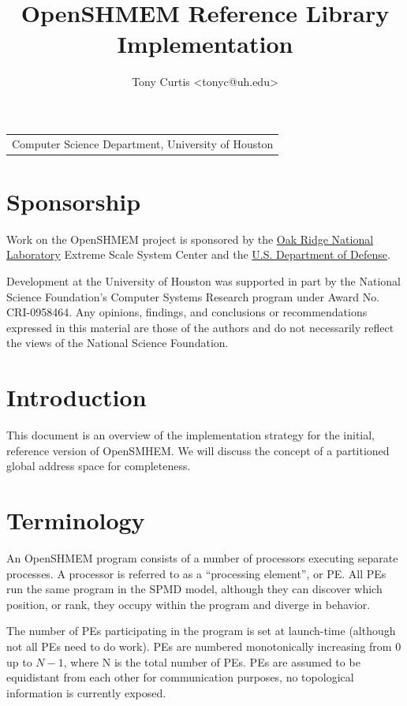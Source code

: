 \documentclass[english]{article}
\newcommand{\lyxrightaddress}[1]{
\par {\raggedleft \begin{tabular}{l}\ignorespaces
#1
\end{tabular}
\vspace{1.4em}
\par}
}
\begin{document}
\title{OpenSHMEM Reference Library Implementation}
\author{Tony Curtis <tonyc@uh.edu>}
\maketitle
\lyxrightaddress{Computer Science Department, University of Houston}

\pagebreak{}
\tableofcontents{}
\pagebreak{}

\section{Sponsorship}

Work on the OpenSHMEM project is sponsored by the
\href{http://www.ornl.gov/}{Oak Ridge National Laboratory} Extreme
Scale System Center and the \href{http://www.defense.gov/}{U.S. Department
of Defense}.

Development at the University of Houston was supported in part by the
National Science Foundation's Computer Systems Research program under
Award No. CRI-0958464.  Any opinions, findings, and conclusions or
recommendations expressed in this material are those of the authors
and do not necessarily reflect the views of the National Science
Foundation.

\section{Introduction}

This document is an overview of the implementation strategy for the
initial, reference version of OpenSMHEM. We will discuss the concept
of a partitioned global address space for completeness.

\section{Terminology}

An OpenSHMEM program consists of a number of processors executing
separate processes. A processor is referred to as a ``processing
element'', or PE. All PEs run the same program in the SPMD model,
although they can discover which position, or rank, they occupy within
the program and diverge in behavior.

The number of PEs participating in the program is set at launch-time
(although not all PEs need to do work). PEs are numbered monotonically
increasing from 0 up to $N-1$, where N is the total number of PEs.
PEs are assumed to be equidistant from each other for communication
purposes, no topological information is currently exposed.
\end{document}
